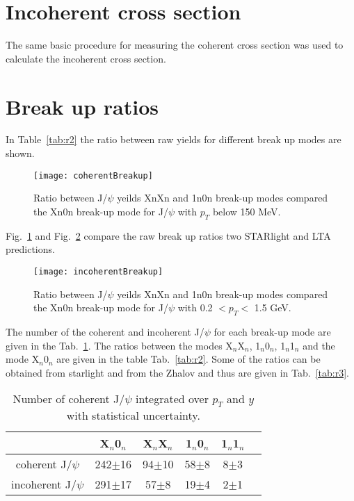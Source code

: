   \section{Incoherent cross section}
  The same basic procedure for measuring the coherent cross section was used to 
    calculate the incoherent cross section.  
  \section{Break up ratios}
    In Table~\ref{tab:r2} the ratio between raw yields for different break up 
      modes are shown.
    \begin{figure}[!Hhtb]
      \centering
      \texttt{[image: coherentBreakup]}
      \caption{Ratio between J/$\psi$ yeilds XnXn and 1n0n break-up modes 
        compared the Xn0n break-up mode for J/$\psi$ with $p_{T}$ below 150 
        MeV.}
      \label{fig:coherentBreakUp}
    \end{figure}
   
    Fig.~\ref{fig:coherentBreakUp} and Fig.~\ref{fig:incoherentBreakUp} compare
      the raw break up ratios two STARlight and LTA predictions. 
    \begin{figure}[!Hhtb]
      \centering
      \texttt{[image: incoherentBreakup]}
      \caption{Ratio between J/$\psi$ yeilds XnXn and 1n0n break-up modes 
        compared the Xn0n break-up mode for J/$\psi$ with 0.2 $< p_{T} <$ 
        1.5 GeV.}
      \label{fig:incoherentBreakUp}
    \end{figure}

    The number of the coherent and incoherent J/$\psi$ for each break-up mode are
      given in the Tab.~\ref{tab:r1}. 
    The ratios between the modes X$_{n}$X$_{n}$, 1$_{n}$0$_{n}$, 1$_{n}$1$_{n}$ and
      the mode  X$_{n}$0$_{n}$ are given in the table Tab.~\ref{tab:r2}. 
    Some of the  ratios can be obtained from  {\sc starlight} and from the Zhalov 
      and thus are given in Tab.~\ref{tab:r3}.
    \begin{table}[h]
      \begin{center}
      \begin{tabular}{|c|c|c|c|c|c|}
        \hline
         &  X$_{n}$0$_{n}$& X$_{n}$X$_{n}$ & 1$_{n}$0$_{n}$ & 1$_{n}$1$_{n}$  \\ \hline
        coherent J/$\psi$ &  242$\pm$16&94$\pm$10&58$\pm$8&8$\pm$3\\ \hline
        incoherent J/$\psi$ & 291$\pm$17&57$\pm$8&19$\pm$4&2$\pm$1\\ \hline
      \end{tabular}
      \caption{\label{tab:r1} Number of coherent J/$\psi$ integrated over $p_{T}$ and $y$ 
        with statistical uncertainty.}
      \end{center}
    \end{table}
    
